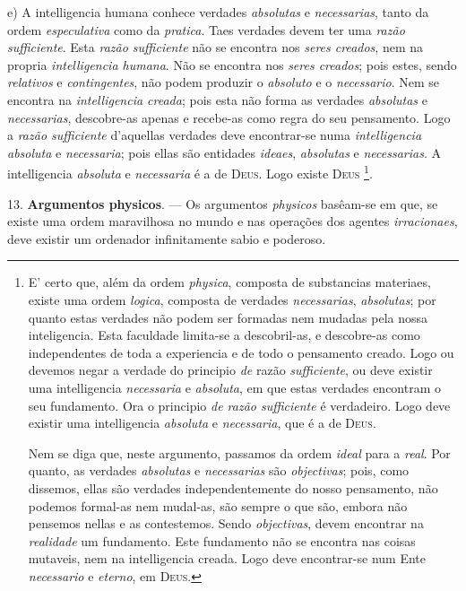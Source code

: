 e) A intelligencia humana conhece verdades \emph{absolutas} e \emph{necessarias}, tanto da ordem \emph{especulativa} como da \emph{pratica}. Taes verdades devem ter uma \emph{razão sufficiente}. Esta \emph{razão sufficiente} não se encontra nos \emph{seres creados}, nem na propria \emph{intelligencia humana}. Não se encontra nos \emph{seres creados}; pois estes, sendo \emph{relativos} e \emph{contingentes}, não podem produzir o \emph{absoluto} e o   \emph{necessario}. Nem se encontra na \emph{intelligencia creada}; pois esta não forma as verdades \emph{absolutas} e \emph{necessarias}, descobre-as apenas e recebe-as como regra do seu pensamento. Logo a \emph{razão sufficiente} d'aquellas verdades deve encontrar-se numa \emph{intelligencia absoluta} e \emph{necessaria}; pois ellas são entidades \emph{ideaes}, \emph{absolutas} e \emph{necessarias}. A intelligencia \emph{absoluta} e \emph{necessaria} é a de \textsc{Deus}. Logo existe \textsc{Deus} \footnote{E' certo que, além da ordem \emph{physica}, composta de substancias materiaes, existe uma ordem \emph{logica}, composta de verdades \emph{necessarias}, \emph{absolutas}; por quanto estas verdades não podem ser formadas nem mudadas pela nossa inteligencia. Esta faculdade limita-se a descobril-as, e descobre-as como independentes de toda a experiencia e de todo o pensamento creado. Logo ou devemos negar a verdade do principio \emph{de} razão \emph{sufficiente}, ou deve existir uma intelligencia \emph{necessaria} e \emph{absoluta}, em que estas verdades encontram o seu fundamento. Ora o principio \emph{de razão sufficiente} é verdadeiro. Logo deve existir uma intelligencia \emph{absoluta} e \emph{necessaria}, que é a de \textsc{Deus}.\par Nem se diga que, neste argumento, passamos da ordem \emph{ideal} para a \emph{real}. Por quanto, as verdades \emph{absolutas} e \emph{necessarias} são \emph{objectivas}; pois, como dissemos, ellas são verdades independentemente do nosso pensamento, não podemos formal-as nem mudal-as, são sempre o que são, embora não pensemos nellas e as contestemos. Sendo \emph{objectivas}, devem encontrar na \emph{realidade} um fundamento. Este fundamento não se encontra nas coisas mutaveis, nem na intelligencia creada. Logo deve encontrar-se num Ente \emph{necessario} e \emph{eterno}, em \textsc{Deus}.}.

13. \textbf{Argumentos physicos}. --- Os argumentos \emph{physicos} basêam-se em que, se existe uma ordem maravilhosa no mundo e nas operações dos agentes \emph{irracionaes}, deve existir um ordenador infinitamente sabio e poderoso.

